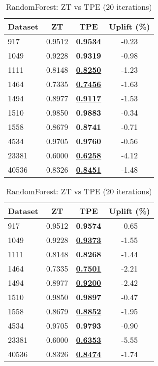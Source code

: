 \begin{table}[htbp]
\begin{center}
\begin{small}
\begin{sc}
\begin{subtable}[t]{0.48\textwidth}
    \centering
    \caption{RandomForest: ZT vs TPE (10 iterations)}
    \label{tab:randomforest-zt-vs-tpe-10}
    \begin{tabular}{lccc}
    \toprule
    \textbf{Dataset} & \textbf{ZT} & \textbf{TPE} & \textbf{Uplift (\%)} \\
    \midrule
    917    & 0.9512 & \textbf{0.9534} & -0.23 \\
    1049    & 0.9228 & \textbf{0.9319} & -0.98 \\
    1111    & 0.8148 & \underline{\textbf{0.8250}} & -1.23 \\
    1464    & 0.7335 & \underline{\textbf{0.7456}} & -1.63 \\
    1494    & 0.8977 & \underline{\textbf{0.9117}} & -1.53 \\
    1510    & 0.9850 & \textbf{0.9883} & -0.34 \\
    1558    & 0.8679 & \textbf{0.8741} & -0.71 \\
    4534    & 0.9705 & \textbf{0.9760} & -0.56 \\
    23381    & 0.6000 & \underline{\textbf{0.6258}} & -4.12 \\
    40536    & 0.8326 & \underline{\textbf{0.8451}} & -1.48 \\
    \bottomrule
    \end{tabular}
\end{subtable}
\hfill
\begin{subtable}[t]{0.48\textwidth}
    \centering
    \caption{RandomForest: ZT vs TPE (20 iterations)}
    \label{tab:randomforest-zt-vs-tpe-20}
    \begin{tabular}{lccc}
    \toprule
    \textbf{Dataset} & \textbf{ZT} & \textbf{TPE} & \textbf{Uplift (\%)} \\
    \midrule
    917    & 0.9512 & \textbf{0.9574} & -0.65 \\
    1049    & 0.9228 & \underline{\textbf{0.9373}} & -1.55 \\
    1111    & 0.8148 & \underline{\textbf{0.8268}} & -1.44 \\
    1464    & 0.7335 & \underline{\textbf{0.7501}} & -2.21 \\
    1494    & 0.8977 & \underline{\textbf{0.9200}} & -2.42 \\
    1510    & 0.9850 & \textbf{0.9897} & -0.47 \\
    1558    & 0.8679 & \underline{\textbf{0.8852}} & -1.95 \\
    4534    & 0.9705 & \textbf{0.9793} & -0.90 \\
    23381    & 0.6000 & \underline{\textbf{0.6353}} & -5.55 \\
    40536    & 0.8326 & \underline{\textbf{0.8474}} & -1.74 \\
    \bottomrule
    \end{tabular}
\end{subtable}


\end{sc}
\end{small}
\end{center}
\end{table}
